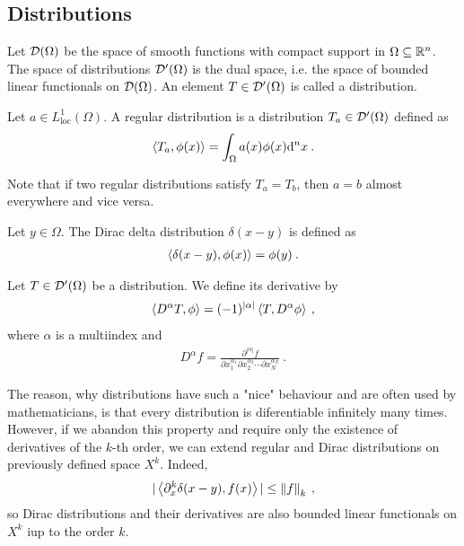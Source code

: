 \subsection{Distributions}

\begin{definition}[Distributions]
    Let $\mathcal{D}(\Omega)$ be the space of smooth functions with compact support in $\Omega \subseteq \mathbb{R}^n$. The space of distributions $\mathcal{D'}(\Omega)$ is the dual space, i.e. the space of bounded linear functionals on $\mathcal{D}(\Omega)$. An element $T \in \mathcal{D'}(\Omega)$ is called a distribution.
\end{definition}

\begin{definition}
    Let $a \in L^1_{\text{loc}}(\Omega)$. A regular distribution is a distribution $T_a \in \mathcal{D'}(\Omega)$ defined as
    \begin{align}
        \left \langle T_a ,\phi(x) \right \rangle = \int_\Omega a(x) \phi(x) \mathrm{d}^n x \:.
    \end{align}
\end{definition}

Note that if two regular distributions satisfy $T_a = T_b$, then $a=b$ almost everywhere and vice versa.

\begin{definition}
    Let $y \in \Omega$. The Dirac delta distribution $\delta(x-y)$ is defined as
    \begin{align}
        \left \langle \delta(x-y) ,\phi(x) \right \rangle = \phi(y) \:. 
    \end{align}
\end{definition}

\begin{definition}
    Let $T \in \mathcal{D'}(\Omega)$ be a distribution. We define its derivative by
    \begin{align}
        \left \langle D^\alpha T ,\phi \right \rangle = (-1)^{|\alpha|} \left \langle T ,D^\alpha \phi \right \rangle \:,
    \end{align}
    where $\alpha$ is a multiindex and
    \begin{align}
        D^\alpha f = \frac{\partial^{|\alpha|} f}{\partial x_1^{\alpha_1} \partial x_2^{\alpha_2} \cdots \partial x^{\alpha_N}_N} \:.
    \end{align}
\end{definition}

The reason, why distributions have such a "nice" behaviour and are often used by mathematicians, is that every distribution is diferentiable infinitely many times. However, if we abandon this property and require only the existence of derivatives of the $k$-th order, we can extend regular and Dirac distributions on previously defined space $X^k$. Indeed,
\begin{align}
    | \left \langle \partial_x^k \delta(x-y) ,f(x) \right \rangle | \leq \left \Vert f \right \Vert_k \:,
\end{align}
so Dirac distributions and their derivatives are also bounded linear functionals on $X^k$ iup to the order $k$.

